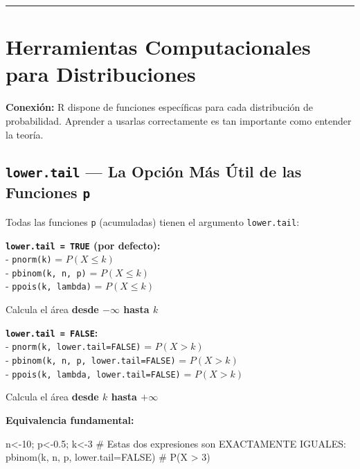 \documentclass[
  letterpaper,
  DIV=11,
  numbers=noendperiod]{scrartcl}
\newenvironment{Shaded}{\begin{snugshade}}{\end{snugshade}}
\newcommand{\AttributeTok}[1]{\textcolor[rgb]{0.40,0.45,0.13}{#1}}
\newcommand{\CommentTok}[1]{\textcolor[rgb]{0.37,0.37,0.37}{#1}}
\newcommand{\ConstantTok}[1]{\textcolor[rgb]{0.56,0.35,0.01}{#1}}
\newcommand{\DecValTok}[1]{\textcolor[rgb]{0.68,0.00,0.00}{#1}}
\newcommand{\FloatTok}[1]{\textcolor[rgb]{0.68,0.00,0.00}{#1}}
\newcommand{\FunctionTok}[1]{\textcolor[rgb]{0.28,0.35,0.67}{#1}}
\newcommand{\NormalTok}[1]{\textcolor[rgb]{0.00,0.23,0.31}{#1}}
\newcommand{\OtherTok}[1]{\textcolor[rgb]{0.00,0.23,0.31}{#1}}
\begin{document}
\begin{center}\rule{0.5\linewidth}{0.5pt}\end{center}

\section{Herramientas Computacionales para
Distribuciones}\label{herramientas-computacionales-para-distribuciones}

\textbf{Conexión:} R dispone de funciones específicas para cada
distribución de probabilidad. Aprender a usarlas correctamente es tan
importante como entender la teoría.

\subsection{\texorpdfstring{\texttt{lower.tail} --- La Opción Más Útil
de las Funciones
\texttt{p}}{lower.tail --- La Opción Más Útil de las Funciones p}}\label{lower.tail-la-opcion-mas-util-de-las-funciones-p}

Todas las funciones \texttt{p} (acumuladas) tienen el argumento
\texttt{lower.tail}:

\textbf{\texttt{lower.tail\ =\ TRUE} (por defecto):}\\
- \texttt{pnorm(k)} = \(P(X \leq k)\)\\
- \texttt{pbinom(k,\ n,\ p)} = \(P(X \leq k)\)\\
- \texttt{ppois(k,\ lambda)} = \(P(X \leq k)\)

Calcula el área \textbf{desde \(-\infty\) hasta \(k\)}

\textbf{\texttt{lower.tail\ =\ FALSE}:}\\
- \texttt{pnorm(k,\ lower.tail=FALSE)} = \(P(X > k)\)\\
- \texttt{pbinom(k,\ n,\ p,\ lower.tail=FALSE)} = \(P(X > k)\)\\
- \texttt{ppois(k,\ lambda,\ lower.tail=FALSE)} = \(P(X > k)\)

Calcula el área \textbf{desde \(k\) hasta \(+\infty\)}

\textbf{Equivalencia fundamental:}

\begin{Shaded}
\begin{Highlighting}[]
\NormalTok{n}\OtherTok{\textless{}{-}}\DecValTok{10}\NormalTok{; p}\OtherTok{\textless{}{-}}\FloatTok{0.5}\NormalTok{; k}\OtherTok{\textless{}{-}}\DecValTok{3}
\CommentTok{\# Estas dos expresiones son EXACTAMENTE IGUALES:}
\FunctionTok{pbinom}\NormalTok{(k, n, p, }\AttributeTok{lower.tail=}\ConstantTok{FALSE}\NormalTok{)  }\CommentTok{\# P(X \textgreater{} 3)}
\end{Highlighting}
\end{Shaded}
\end{document}
